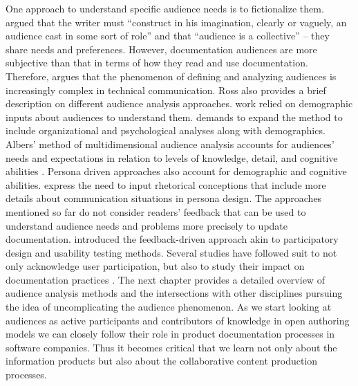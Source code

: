 One approach to understand specific audience needs is to fictionalize them. \textcite{ong1975writer} argued that the writer must “construct in his imagination, clearly or vaguely, an audience cast in some sort of role” and that “audience is a collective” – they share needs and preferences. However, documentation audiences are more subjective than that in terms of how they read and use documentation. Therefore, \textcite{ross2013deep} argues that the phenomenon of defining and analyzing audiences is increasingly complex in technical communication. Ross also provides a brief description on different audience analysis approaches. \textcite{ede1984audience} work relied on demographic inputs about audiences to understand them. \textcite{warren1993three} demands to expand the method to include organizational and psychological analyses along with demographics. Albers’ method of multidimensional audience analysis accounts for audiences’ needs and expectations in relation to levels of knowledge, detail, and cognitive abilities \cite{albers2004communication}. Persona driven approaches also account for demographic and cognitive abilities. \textcite{coney2000role} express the need to input rhetorical conceptions that include more details about communication situations in persona design. The approaches mentioned so far do not consider readers' feedback that can be used to understand audience needs and problems more precisely to update documentation. \textcite{schriver2010document} introduced the feedback-driven approach akin to participatory design and usability testing methods. Several studies have followed suit to not only acknowledge user participation, but also to study their impact on documentation practices \cite{johnson2013solving, swarts2018wicked}. The next chapter provides a detailed overview of audience analysis methods and the intersections with other disciplines pursuing the idea of uncomplicating the audience phenomenon. As we start looking at audiences as active participants and contributors of knowledge in open authoring models we can closely follow their role in product documentation processes in software companies. Thus it becomes critical that we learn not only about the information products but also about the collaborative content production processes.

